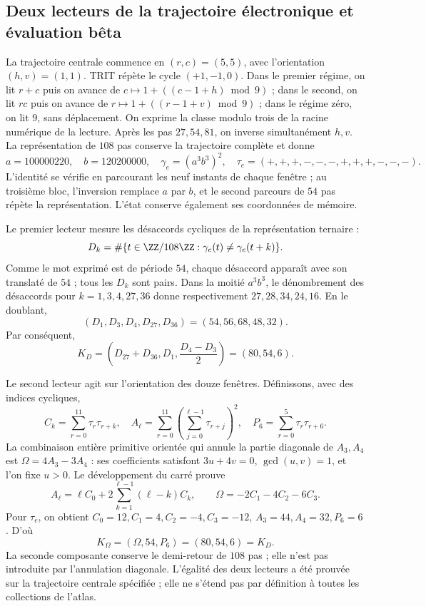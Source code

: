 \subsection{Deux lecteurs de la trajectoire électronique et évaluation bêta}
\label{vi:dep:beta}

La trajectoire centrale commence en \((r,c)=(5,5)\), avec
l’orientation \((h,v)=(1,1)\). TRIT répète le cycle \((+1,-1,0)\).
Dans le premier régime, on lit \(r+c\) puis on avance de
\(c\mapsto1+((c-1+h)\bmod9)\) ; dans le second, on lit \(rc\) puis
on avance de \(r\mapsto1+((r-1+v)\bmod9)\) ; dans le régime
zéro, on lit \(9\), sans déplacement. On exprime la classe modulo
trois de la racine numérique de la lecture. Après les pas \(27,54,81\),
on inverse simultanément \(h,v\). La représentation de \(108\)
pas conserve la trajectoire complète et donne
\begin{equation}
 a=100000220,\quad b=120200000,\quad
 \gamma_e=(a^3b^3)^2,
 \quad\tau_e=(+,+,+,-,-,-,+,+,+,-,-,-).
 \label{vi:dep:trayectoria-electron}
\end{equation}
L’identité se vérifie en parcourant les neuf instants de chaque
fenêtre ; au troisième bloc, l’inversion remplace \(a\) par \(b\),
et le second parcours de \(54\) pas répète la représentation.
L’état conserve également ses coordonnées de mémoire.

Le premier lecteur mesure les désaccords cycliques de la représentation ternaire :
\[
 D_k=\#\{t\in\ZZ/108\ZZ:\gamma_e(t)\ne\gamma_e(t+k)\}.
\]
Comme le mot exprimé est de période \(54\), chaque désaccord
apparaît avec son translaté de \(54\) ; tous les \(D_k\) sont pairs.
Dans la moitié \(a^3b^3\), le dénombrement des désaccords pour
\(k=1,3,4,27,36\) donne respectivement \(27,28,34,24,16\).
En le doublant,
\[
 (D_1,D_3,D_4,D_{27},D_{36})=(54,56,68,48,32).
\]
Par conséquent,
\begin{equation}
 K_D=\left(D_{27}+D_{36},D_1,\frac{D_4-D_3}{2}\right)
     =(80,54,6).
 \label{vi:dep:KD}
\end{equation}

Le second lecteur agit sur l’orientation des douze fenêtres.
Définissons, avec des indices cycliques,
\[
 C_k=\sum_{r=0}^{11}\tau_r\tau_{r+k},\quad
 A_\ell=\sum_{r=0}^{11}\left(\sum_{j=0}^{\ell-1}\tau_{r+j}\right)^2,
 \quad P_6=\sum_{r=0}^{5}\tau_r\tau_{r+6}.
\]
La combinaison entière primitive orientée qui annule la partie diagonale
de \(A_3,A_4\) est \(\Omega=4A_3-3A_4\) : ses coefficients
satisfont \(3u+4v=0\), \(\gcd(u,v)=1\), et l’on fixe \(u>0\).
Le développement du carré prouve
\[
 A_\ell=\ell C_0+
     2\sum_{k=1}^{\ell-1}(\ell-k)C_k,
 \qquad\Omega=-2C_1-4C_2-6C_3.
\]
Pour \(\tau_e\), on obtient
\(C_0=12,C_1=4,C_2=-4,C_3=-12\),
\(A_3=44,A_4=32,P_6=6\). D’où
\begin{equation}
 K_\Omega=(\Omega,54,P_6)=(80,54,6)=K_D.
 \label{vi:dep:KOmega}
\end{equation}
La seconde composante conserve le demi-retour de \(108\) pas ;
elle n’est pas introduite par l’annulation diagonale. L’égalité des deux
lecteurs a été prouvée sur la trajectoire centrale spécifiée ;
elle ne s’étend pas par définition à toutes les collections de l’atlas.

